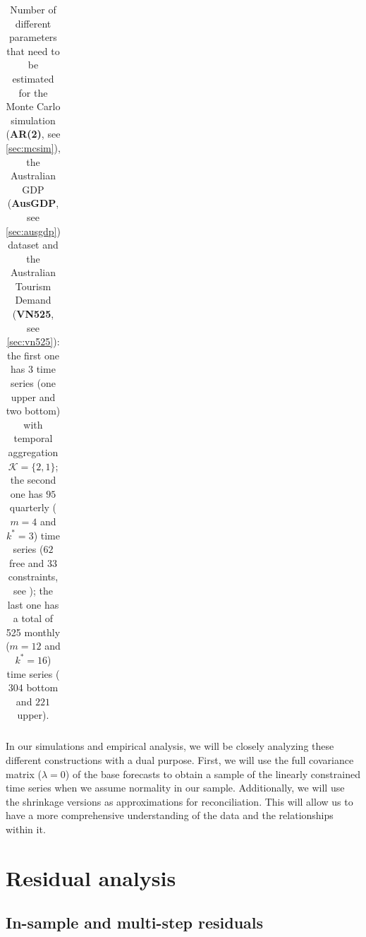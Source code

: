 \documentclass[a4paper,11pt]{article}
\theoremstyle{definition}
\begin{document}
\begin{table}[!htb]
\begin{tabular}{M{0.25\linewidth}cccc}
	\end{tabular}
	\endgroup
	\caption{Number of different parameters that need to be estimated for the Monte Carlo simulation (\textbf{AR(2)}, see \autoref{sec:mcsim}), the Australian GDP (\textbf{AusGDP}, see \autoref{sec:ausgdp}) dataset and the Australian Tourism Demand (\textbf{VN525}, see \autoref{sec:vn525}): the first one has $3$ time series (one upper and two bottom) with temporal aggregation $\mathcal{K} = \{2, 1\}$; the second one has $95$ quarterly ($m = 4$ and $k^\ast = 3$) time series ($62$ free and $33$ constraints, see \citealp{giro2022}); the last one has a total of 525 monthly ($m = 12$ and $k^\ast = 16$) time series ($304$ bottom and $221$ upper).}
	\label{tab:num_param_data}
\end{table}

In our simulations and empirical analysis, we will be closely analyzing these different constructions with a dual purpose. First, we will use the full covariance matrix ($\lambda = 0$) of the base forecasts to obtain a sample of the linearly constrained time series when we assume normality in our sample. Additionally, we will use the shrinkage versions as approximations for reconciliation. This will allow us to have a more comprehensive understanding of the data and the relationships within it.


\section{Residual analysis}\label{sec:res}

\subsection{In-sample and multi-step residuals} \label{ssec:multi_res}
\end{document}
